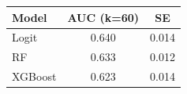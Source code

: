 \centering
\small
\begin{tabular}{lcc}
\hline
Model & AUC (k=60) & SE \\
\hline
Logit & 0.640 & 0.014 \\
RF & 0.633 & 0.012 \\
XGBoost & 0.623 & 0.014 \\
\hline
\end{tabular}
